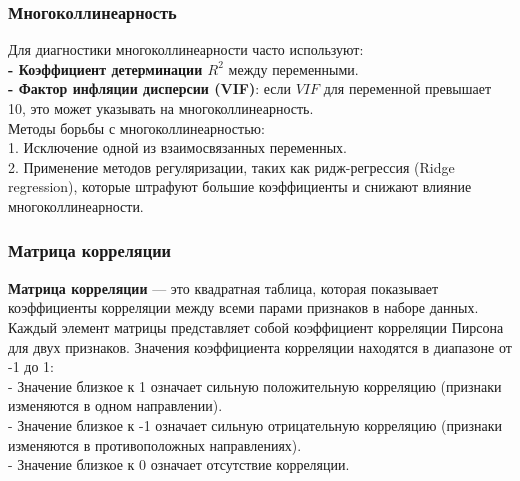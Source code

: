\documentclass[aspectratio=169]{beamer}
\begin{document}
\begin{frame}
\frametitle{Многоколлинеарность}
Для диагностики многоколлинеарности часто используют:\\
{\bf - Коэффициент детерминации \( R^2 \)} между переменными.\\
{\bf - Фактор инфляции дисперсии (VIF)}: если \( VIF \) для переменной превышает 10, это может указывать на многоколлинеарность.\\
Методы борьбы с многоколлинеарностью:\\
1. Исключение одной из взаимосвязанных переменных.\\
2. Применение методов регуляризации, таких как ридж-регрессия (Ridge regression), которые штрафуют большие коэффициенты и снижают влияние многоколлинеарности.
\end{frame}

\begin{frame}
\frametitle{Матрица корреляции}
{\bf Матрица корреляции} — это квадратная таблица, которая показывает коэффициенты корреляции между всеми парами признаков в наборе данных. Каждый элемент матрицы представляет собой коэффициент корреляции Пирсона для двух признаков. Значения коэффициента корреляции находятся в диапазоне от -1 до 1:\\
- Значение близкое к 1 означает сильную положительную корреляцию (признаки изменяются в одном направлении).\\
- Значение близкое к -1 означает сильную отрицательную корреляцию (признаки изменяются в противоположных направлениях).\\
- Значение близкое к 0 означает отсутствие корреляции.
\end{frame}
\end{document}

